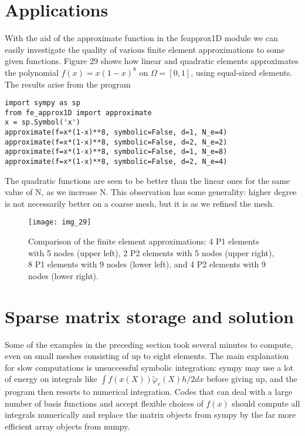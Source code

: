 \documentclass[../main.tex]{subfiles}
\begin{document}
\section[Applications]{Applications}
\label{sec:sec_4_7}
\noindent With the aid of the approximate function in the fe\textunderscore approx1D module we can easily investigate the quality of various finite element approximations to some given functions. Figure 29 shows how linear and quadratic elements approximates the polynomial $f(x)=x(1-x)^{8}$ on $\Omega=[0,1]$, using equal-sized elements. The results arise from the program
\begin{lstlisting}[numbers=none]
import sympy as sp
from fe_approx1D import approximate
x = sp.Symbol('x')
approximate(f=x*(1-x)**8, symbolic=False, d=1, N_e=4)
approximate(f=x*(1-x)**8, symbolic=False, d=2, N_e=2)
approximate(f=x*(1-x)**8, symbolic=False, d=1, N_e=8)
approximate(f=x*(1-x)**8, symbolic=False, d=2, N_e=4)	
\end{lstlisting}
The quadratic functions are seen to be better than the linear ones for the same
value of N, as we increase N. This observation has some generality: higher
degree is not necessarily better on a coarse mesh, but it is as we refined the
mesh.
\begin{figure}[H]
	\centering
	\texttt{[image: img\_29]}
	\caption{Comparison of the finite element approximations: 4 P1 elements with
		5 nodes (upper left), 2 P2 elements with 5 nodes (upper right), 8 P1 elements
		with 9 nodes (lower left), and 4 P2 elements with 9 nodes (lower right).}
	\label{fig:img_29}
\end{figure}
\section[Sparse matrix storage and solution]{Sparse matrix storage and solution}
\label{sec:sec_4_8}
\noindent Some of the examples in the preceding section took several minutes to compute, even on small meshes consisting of up to eight elements. The main explanation for slow computations is unsuccessful symbolic integration: sympy may use a lot of energy on integrals like $\int f(x(X)) \tilde{\varphi}_{r}(X) h / 2 d x$ before giving up, and the program then resorts to numerical integration. Codes that can deal with a large number of basis functions and accept flexible choices of $f(x)$ should compute all integrals numerically and replace the matrix objects from sympy by the far more efficient array objects from numpy.
\end{document}

